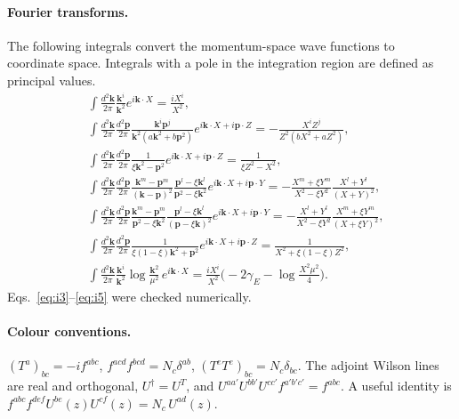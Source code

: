 \paragraph*{Fourier transforms.} The following integrals convert the momentum-space wave functions to coordinate space. Integrals with a pole in the integration region are defined as principal values.
\begin{align}
&\int\frac{d^2\mathbf k}{2\pi}\frac{\mathbf k^i}{\mathbf k^2}e^{i\mathbf k\cdot X}=\frac{iX^i}{X^2},\label{eq:i1}\\
&\int\frac{d^2\mathbf k}{2\pi}\frac{d^2\mathbf p}{2\pi}\frac{\mathbf k^i\mathbf p^j}{\mathbf k^2(a\mathbf k^2+b\mathbf p^2)}e^{i\mathbf k\cdot X+i\mathbf p\cdot Z}=-\frac{X^iZ^j}{Z^2(bX^2+aZ^2)},\label{eq:i2}\\
&\int\frac{d^2\mathbf k}{2\pi}\frac{d^2\mathbf p}{2\pi}\frac{1}{\xi\mathbf k^2-\mathbf p^2}e^{i\mathbf k\cdot X+i\mathbf p\cdot Z}=\frac{1}{\xi Z^2-X^2},\label{eq:i3}\\
&\int\frac{d^2\mathbf k}{2\pi}\frac{d^2\mathbf p}{2\pi}\frac{\mathbf k^m-\mathbf p^m}{(\mathbf k-\mathbf p)^2}\frac{\mathbf p^l-\xi\mathbf k^l}{\mathbf p^2-\xi\mathbf k^2}e^{i\mathbf k\cdot X+i\mathbf p\cdot Y}=-\frac{X^m+\xi Y^m}{X^2-\xi Y^2}\frac{X^l+Y^l}{(X+Y)^2},\label{eq:i4}\\
&\int\frac{d^2\mathbf k}{2\pi}\frac{d^2\mathbf p}{2\pi}\frac{\mathbf k^m-\mathbf p^m}{\mathbf p^2-\xi\mathbf k^2}\frac{\mathbf p^l-\xi\mathbf k^l}{(\mathbf p-\xi\mathbf k)^2}e^{i\mathbf k\cdot X+i\mathbf p\cdot Y}=-\frac{X^l+Y^l}{X^2-\xi Y^2}\frac{X^m+\xi Y^m}{(X+\xi Y)^2},\label{eq:i5}\\
&\int\frac{d^2\mathbf k}{2\pi}\frac{d^2\mathbf p}{2\pi}\frac{1}{\xi(1-\xi)\mathbf k^2+\mathbf p^2}e^{i\mathbf k\cdot X+i\mathbf p\cdot Z}=\frac{1}{X^2+\xi(1-\xi)Z^2},\label{eq:i7}\\
&\int\frac{d^2\mathbf k}{2\pi}\frac{\mathbf k^i}{\mathbf k^2}\log\frac{\mathbf k^2}{\mu^2}\,e^{i\mathbf k\cdot X}=\frac{iX^i}{X^2}\Big(-2\gamma_E-\log\frac{X^2\mu^2}{4}\Big).\label{eq:i9}
\end{align}
Eqs.~\eqref{eq:i3}--\eqref{eq:i5} were checked numerically.

\paragraph*{Colour conventions.} $(T^a)_{bc}=-if^{abc}$, $f^{acd}f^{bcd}=N_c\delta^{ab}$, $(T^eT^e)_{bc}=N_c\delta_{bc}$. The adjoint Wilson lines are real and orthogonal, $U^\dagger=U^T$, and $U^{aa'}U^{bb'}U^{cc'}f^{a'b'c'}=f^{abc}$. A useful identity is $f^{abc}f^{def}U^{be}(z)U^{cf}(z)=N_c\,U^{ad}(z)$.
